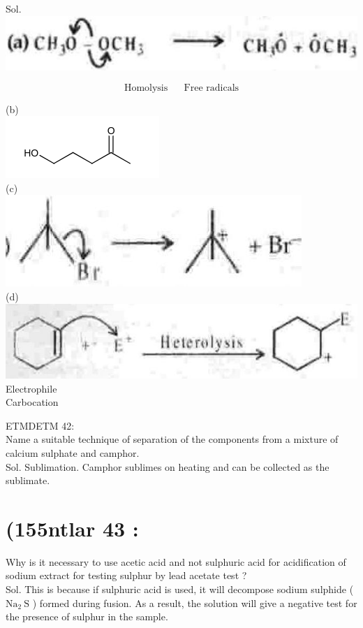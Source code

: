 \documentclass[10pt]{article}
\begin{document}
Sol.\\
\includegraphics[max width=\textwidth, center]{2025_01_28_8470952b98110cec3aabg-130(1)}

$$
\text { Homolysis } \quad \text { Free radicals }
$$

(b)\\
\includegraphics{smile-277bb934ae7f6af3b68ff3ba4cd58a1f6aafa09f}\\
(c)\\
\includegraphics[max width=\textwidth, center]{2025_01_28_8470952b98110cec3aabg-131(1)}\\
(d)\\
\includegraphics[max width=\textwidth, center]{2025_01_28_8470952b98110cec3aabg-131(2)}\\
Electrophile\\
Carbocation

ETMDETM 42:\\
Name a suitable technique of separation of the components from a mixture of calcium sulphate and camphor.\\
Sol. Sublimation. Camphor sublimes on heating and can be collected as the sublimate.

\section*{(155ntlar 43 :}
Why is it necessary to use acetic acid and not sulphuric acid for acidification of sodium extract for testing sulphur by lead acetate test ?\\
Sol. This is because if sulphuric acid is used, it will decompose sodium sulphide ( $\mathrm{Na}_{2} \mathrm{~S}$ ) formed during fusion. As a result, the solution will give a negative test for the presence of sulphur in the sample.
\end{document}
